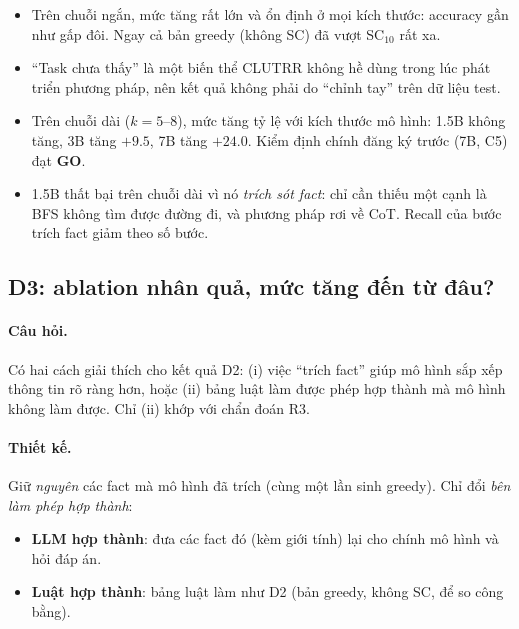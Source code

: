 \documentclass[11pt]{article}
\begin{document}
\begin{cachdoc}
\begin{itemize}[leftmargin=*,itemsep=1pt]
\item Trên chuỗi ngắn, mức tăng rất lớn và ổn định ở mọi kích thước: accuracy gần như gấp đôi.
  Ngay cả bản greedy (không SC) đã vượt SC$_{10}$ rất xa.
\item ``Task chưa thấy'' là một biến thể CLUTRR không hề dùng trong lúc phát triển phương pháp, nên
  kết quả không phải do ``chỉnh tay'' trên dữ liệu test.
\item Trên chuỗi dài ($k=5$--8), mức tăng tỷ lệ với kích thước mô hình: 1.5B không tăng, 3B tăng
  $+9.5$, 7B tăng $+24.0$. Kiểm định chính đăng ký trước (7B, C5) đạt
  \textcolor{luc}{\textbf{GO}}.
\item 1.5B thất bại trên chuỗi dài vì nó \emph{trích sót fact}: chỉ cần thiếu một cạnh là BFS không
  tìm được đường đi, và phương pháp rơi về CoT. Recall của bước trích fact giảm theo số bước.
\end{itemize}
\end{cachdoc}

\subsection{D3: ablation nhân quả, mức tăng đến từ đâu?}

\paragraph{Câu hỏi.} Có hai cách giải thích cho kết quả D2: (i) việc ``trích fact'' giúp mô hình
sắp xếp thông tin rõ ràng hơn, hoặc (ii) bảng luật làm được phép hợp thành mà mô hình không làm
được. Chỉ (ii) khớp với chẩn đoán R3.

\paragraph{Thiết kế.} Giữ \emph{nguyên} các fact mà mô hình đã trích (cùng một lần sinh greedy).
Chỉ đổi \emph{bên làm phép hợp thành}:
\begin{itemize}[leftmargin=*,itemsep=1pt]
\item \textbf{LLM hợp thành}: đưa các fact đó (kèm giới tính) lại cho chính mô hình và hỏi đáp án.
\item \textbf{Luật hợp thành}: bảng luật làm như D2 (bản greedy, không SC, để so công bằng).
\end{itemize}
\end{document}
